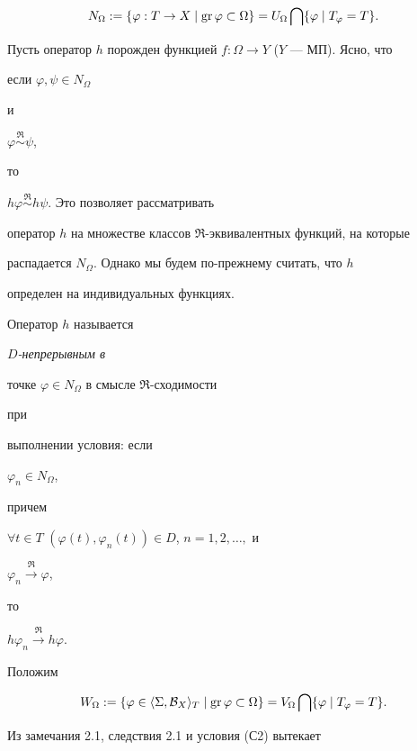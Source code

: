 $$


N_\Omega := \{\varphi:T\to X\mid \gr\varphi


\subset\Omega\} = U_\Omega\bigcap\{\varphi\mid T_\varphi=T\}.


$$


Пусть оператор $h$ порожден функцией $f:\Omega\to Y$ ($Y$ --- МП). Ясно, что


если $\varphi,\psi\in N_\Omega$


и


$\varphi\overset{\Re}{\sim}\psi$,


то


$h\varphi\overset{\Re}{\sim}h\psi$. Это позволяет рассматривать


оператор $h$ на множестве классов $\Re$-эквивалентных функций, на которые


распадается $N_\Omega$. Однако мы будем по-прежнему считать, что $h$


определен на индивидуальных функциях.





\begin{defns} Оператор $h$ называется {\em $D$-непрерывным в


точке $\varphi\in N_\Omega$ в смысле $\Re$-сходимости} при


выполнении условия: если


$\varphi_n\in N_\Omega$,


причем


$\forall t\in T$ \; $(\varphi(t),\varphi_n(t))\in D$, $n=1,2,\dotsc,$ и


$\varphi_n\overset{\Re}{\longrightarrow}\varphi$,


то


$h\varphi_n\overset{\Re}{\longrightarrow}h\varphi$.


\end{defns}





Положим


$$


W_\Omega := \{\varphi\in\langle \Sigma ,{\cal B}_X\rangle _T


\mid \gr\varphi\subset\Omega\} = V_\Omega\bigcap\{\varphi


\mid T_\varphi=T\}.


$$


Из замечания 2.1, следствия 2.1 и условия (С2) вытекает





